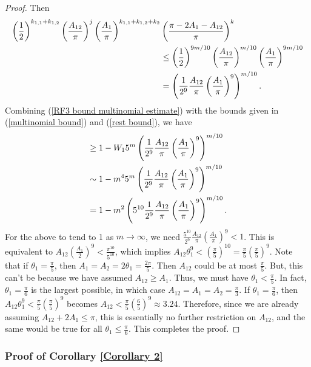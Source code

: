 \documentclass[twoside,11pt]{article}
\newcommand{\edit}[1]{{{#1}}}
\begin{document}
\begin{proof}
Then
\begin{align}
 \left(\frac{1}{2} \right)^{k_{1,1}+k_{1,2}} \left(\frac{A_{12}}{\pi}\right)^j \left(\frac{A_1}{\pi} \right)^{k_{1,1}+k_{1,2}+k_2} &\left(\frac{\pi-2A_1-A_{12}}{\pi}\right)^k \\
 &\leq \left(\frac{1}{2} \right)^{9m/10} \left(\frac{A_{12}}{\pi} \right)^{m/10} \left(\frac{A_1}{\pi} \right)^{9m/10} \notag\\
 &= \left(\frac{1}{2^9} \frac{A_{12}}{\pi} \left(\frac{A_1}{\pi}\right)^9 \right)^{m/10}.\label{rest bound}
\end{align}
Combining (\ref{RF3 bound multinomial estimate}) with the bounds given in (\ref{multinomial bound}) and (\ref{rest bound}), we have
\begin{align}
&\geq 1 - W_1  \edit{5^m}%
\left(\frac{1}{2^9} \frac{A_{12}}{\pi} \left(\frac{A_1}{\pi}\right)^9 \right)^{m/10} \notag\\
&\sim 1- m^4  \edit{5^m}%
\left(\frac{1}{2^9} \frac{A_{12}}{\pi} \left(\frac{A_1}{\pi}\right)^9 \right)^{m/10} \notag\\
&= 1- m^2  %
\left(5^{10} \frac{1}{2^9} \frac{A_{12}}{\pi} \left(\frac{A_1}{\pi}\right)^9 \right)^{m/10}.
\end{align}
For the above to tend to 1 as $m\rightarrow \infty$, we need $ \frac{5^{10}}{2^9}  \frac{A_{12}}{\pi} \left(\frac{A_1}{\pi}\right)^9 < 1$. This is equivalent to $A_{12} \left(\frac{A_1}{2}\right)^9 < \frac{\pi^{10}}{5^{10}}$, which implies $A_{12} \theta_1^9 < \left(\frac{\pi}{5}\right)^{10} = \frac{\pi}{5}\left(\frac{\pi}{5}\right)^{9}$. Note that if $\theta_1 = \frac{\pi}{5}$, then $A_1 = A_2 = 2\theta_1 = \frac{2\pi}{5}$. Then $A_{12}$ could be at most $\frac{\pi}{5}$. But, this can't be because we have assumed $A_{12} \geq A_1$. Thus, we must have $\theta_1 < \frac{\pi}{5}$. In fact, $\theta_1 = \frac{\pi}{6}$ is the largest possible, in which case $A_{12} = A_1 = A_2 = \frac{\pi}{3}$. If $ \theta_1 = \frac{\pi}{6}$, then $A_{12} \theta_1^9 < \frac{\pi}{5}\left(\frac{\pi}{5}\right)^{9}$ becomes $A_{12} < \frac{\pi}{5} \left(\frac{6}{5} \right)^9 \approx 3.24$. Therefore, since we are already assuming $A_{12} + 2A_1 \leq \pi$, this is essentially no further restriction on $A_{12}$, and the same would be true for all $\theta_1 \leq \frac{\pi}{6}$. This completes the proof.
\end{proof}

\subsubsection{Proof of Corollary \ref{Corollary 2}}
\end{document}
